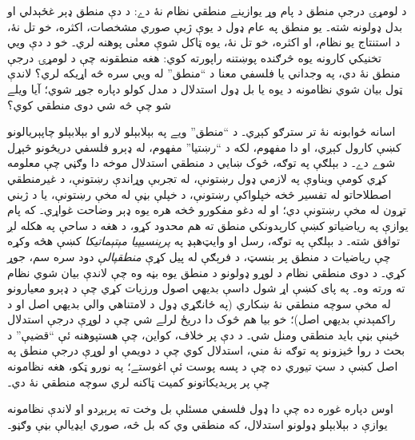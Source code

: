 \documentclass[../../../include/open-logic-section]{subfiles}
\begin{document}


د لومړۍ درجې منطق د پام وړ يوازينے منطقي نظام نۀ دے: د دې منطق ډېر
غځېدلي او بدل ډولونه شته۔ يو منطق په عام ډول د يوې ژبې صوري مشخصات،
اکثره، خو تل نۀ، د استنتاج يو نظام، او اکثره، خو تل نۀ، يوه ټاکل شوې
معنٰی پوهنه لري۔ خو د دې ويي تخنيکي کارونه يوه څرګنده پوښتنه راپورته
کوي: هغه منطقونه چې د لومړۍ درجې منطق نۀ دي، په وجداني يا فلسفي معنا
د ``منطق'' له ويي سره څه اړيکه لري؟ لاندې ټول بيان شوي نظامونه د يوه
يا بل ډول استدلال د مدل کولو دپاره جوړ شوي؛ آيا ويلے شو چې څه شي دوى
منطقي کوي؟

اسانه ځوابونه نۀ تر سترګو کېږي۔ د ``منطق'' ويے په بېلابېلو لارو او
بېلابېلو چاپېريالونو کښې کارول کېږي، او دا مفهوم، لکه د ``رښتيا''
مفهوم، له ډېرو فلسفي دريځونو څېړل شوے دے۔ د بېلګې په توګه، څوک ښايي
د منطقي استدلال موخه دا وګڼي چې معلومه کړي کومې ويناوې په لازمي ډول
رښتونې، له تجربې وړاندې رښتونې، د غيرمنطقي اصطلاحاتو له تفسير څخه
خپلواکې رښتونې، د خپلې بڼې له مخې رښتونې، يا د ژبني تړون له مخې
رښتونې دي؛ او له دغو مفکورو څخه هره يوه ډېر وضاحت غواړي۔ که پام يوازې
په رياضياتو کښې کارېدونکي منطق ته هم محدود کړو، د هغه د ساحې په هکله لږ
توافق شته۔ د بېلګې په توګه، رسل او وايټ‌هېډ په
\textit{پرېنسيپيا مېتېماتيکا} کښې هڅه وکړه چې رياضيات د منطق پر بنسټ،
د فرېګې له پيل کړې {\em منطقپالې} دود سره سم، جوړ کړي۔ د دوى منطقي
نظام د لوړو ډولونو د منطق يوه بڼه وه چې لاندې بيان شوي نظام ته ورته
وه۔ په پاى کښې اړ شول داسې بديهي اصول ورزيات کړي چې د ډېرو معيارونو
له مخې سوچه منطقي نۀ ښکاري (په ځانګړي ډول د لامتناهي والي بديهي اصل
او د راکمېدنې بديهي اصل)؛ خو بيا هم څوک دا دريځ لرلے شي چې د لوړې
درجې استدلال ځينې بڼې بايد منطقي ومنل شي۔ د دې پر خلاف، کواين، چې
هستپوهنه ئې ``قضيې'' د بحث د روا څيزونو په توګه نۀ مني، استدلال کوي
چې د دويمې او لوړې درجې منطق په اصل کښې د سټ تيوري ده چې د پسه پوست
ئې اغوستے؛ په نورو ټکو، هغه نظامونه چې پر پريديکاتونو کميت ټاکنه لري
سوچه منطقي نۀ دي۔

اوس دپاره غوره ده چې دا ډول فلسفي مسئلې بل وخت ته پرېږدو او لاندې
نظامونه يوازې د بېلابېلو ډولونو استدلال، که منطقي وي که بل څه، صوري
ايډيالې بڼې وګڼو۔
\end{document}
